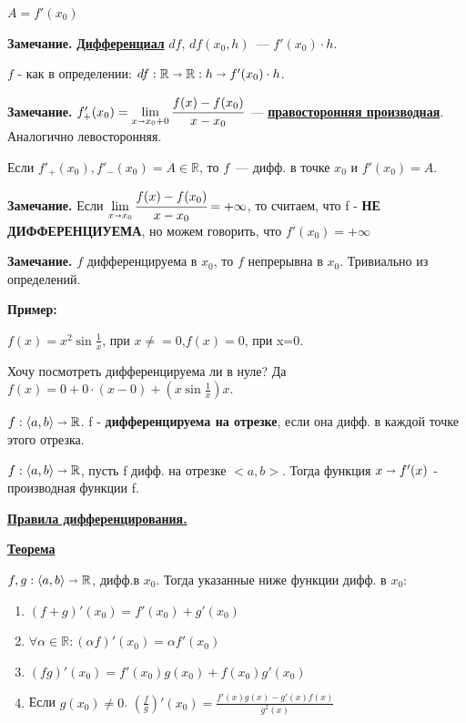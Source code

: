 \documentclass{article}
\newcommand{\deff}[1]{\underline{\textbf{#1}}}
\newcommand{\thmm}[1]{\underline{\textbf{#1}}}
\begin{document}
$A = f'(x_0)$

\textbf{Замечание.} \deff{Дифференциал} $df$, $df(x_0,h)$~--- $f'(x_0) \cdot h$.

$f$ - как в определении: $df: \mathbb{R} \shortrightarrow \mathbb{R}: h \shortrightarrow f'(x_0) \cdot h$.

\textbf{Замечание.} $f'_+(x_0) = \lim\limits_{x \shortrightarrow x_0+0} \cfrac{f(x)-f(x_0)}{x-x_0}$~--- \deff{правосторонняя производная}. Аналогично левосторонняя.

Если $f'_+(x_0), f'_-(x_0) = A \in \mathbb{R}$, то $f$~--- дифф. в точке $x_0$ и $f'(x_0)=A$.

\textbf{Замечание.} Если $\lim\limits_{x \shortrightarrow x_0} \cfrac{f(x)-f(x_0)}{x-x_0} = +\infty$, то считаем, что f - \textbf{НЕ ДИФФЕРЕНЦИУЕМА}, но можем говорить, что $f'(x_0) = +\infty$
 
\textbf{Замечание.} $f $ дифференцируема в $x_0$, то $f$ непрерывна в $x_0$. Тривиально из определений.

\textbf{Пример:}

$f(x) = x^2 \sin \frac{1}{x} $, при $x\neq =0$,$f(x)=0$, при x=0.

Хочу посмотреть дифференцируема ли в нуле? Да $f(x) = 0 + 0\cdot(x-0) + (x \sin \frac{1}{x})x $. 

$f:  \langle  a,b \rangle \shortrightarrow \mathbb{R}$. f - \textbf{дифференцируема на отрезке}, если она дифф. в каждой точке этого отрезка.

$f: \langle a,b\rangle \shortrightarrow \mathbb{R}$,  пусть f дифф. на отрезке $<a,b>$.  Тогда функция $x\shortrightarrow f'(x)$ - производная функции f.


\deff{Правила дифференцирования.}

\thmm{Теорема}

$f,g: \langle a,b\rangle \shortrightarrow \mathbb{R}$, дифф.в $x_0$. Тогда указанные ниже функции  дифф. в $x_0$:

\begin{enumerate}
    \item $(f+g)' (x_0) = f'(x_0) + g'(x_0)$
    \item $\forall \alpha \in \mathbb{R}: (\alpha f)'(x_0) = \alpha f'(x_0)$
    \item $(fg)'(x_0) = f'(x_0)g(x_0) + f(x_0)g'(x_0)$
    \item Если $g(x_0)\neq 0$. $(\frac{f}{g})'(x_0) = \frac{f'(x)g(x)-g'(x)f(x)}{g^2(x)}$
\end{enumerate}
\end{document}
